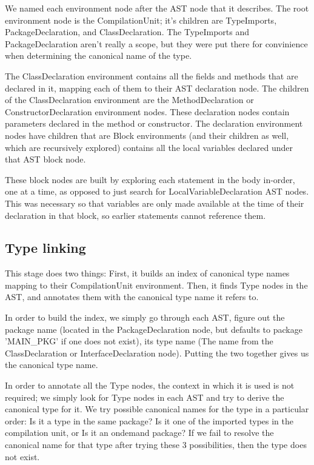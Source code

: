 \documentclass[12pt]{article}
\begin{document}
We named each environment node after the AST node that it describes.  The root
environment node is the CompilationUnit;  it's children are TypeImports,
PackageDeclaration, and ClassDeclaration.  The TypeImports and
PackageDeclaration aren't really a scope, but they were put there for
convinience when determining the canonical name of the type.

The ClassDeclaration environment contains all the fields and methods that are
declared in it, mapping each of them to their AST declaration node.  The
children of the ClassDeclaration environment are the MethodDeclaration or
ConstructorDeclaration environment nodes.  These declaration nodes contain
parameters declared in the method or constructor.  The declaration environment
nodes have children that are Block environments (and their children as well,
which are recursively explored) contains all the local variables declared under
that AST block node.

These block nodes are built by exploring each statement in the body in-order, one at a
time, as opposed to just search for LocalVariableDeclaration AST nodes.  This
was necessary so that variables are only made available at the time of their
declaration in that block, so earlier statements cannot reference them.

\subsection{Type linking}
This stage does two things:  First, it builds an index of canonical type names
mapping to their CompilationUnit environment.  Then, it finds Type nodes in the
AST, and annotates them with the canonical type name it refers to.

In order to build the index, we simply go through each AST, figure out the
package name (located in the PackageDeclaration node, but defaults to package
'MAIN_PKG' if one does not exist), its type name (The name from the
ClassDeclaration or InterfaceDeclaration node).  Putting the two together gives
us the canonical type name.

In order to annotate all the Type nodes, the context in which it is used is not
required;  we simply look for Type nodes in each AST and try to derive the
canonical type for it.  We try possible canonical names for the type in a
particular order:  Is it a type in the same package?  Is it one of the imported
types in the compilation unit, or Is it an ondemand package?  If we fail to
resolve the canonical name for that type after trying these 3 possibilities,
then the type does not exist.
\end{document}
